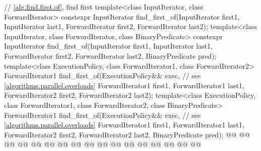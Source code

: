 \begin{codeblock}
{  // \ref{alg.find.first.of}, find first
  template<class InputIterator, class ForwardIterator>
    constexpr InputIterator
      find_first_of(InputIterator first1, InputIterator last1,
                    ForwardIterator first2, ForwardIterator last2);
  template<class InputIterator, class ForwardIterator, class BinaryPredicate>
    constexpr InputIterator
      find_first_of(InputIterator first1, InputIterator last1,
                    ForwardIterator first2, ForwardIterator last2,
                    BinaryPredicate pred);
  template<class ExecutionPolicy, class ForwardIterator1, class ForwardIterator2>
    ForwardIterator1
      find_first_of(ExecutionPolicy&& exec, // see \ref{algorithms.parallel.overloads}
                    ForwardIterator1 first1, ForwardIterator1 last1,
                    ForwardIterator2 first2, ForwardIterator2 last2);
  template<class ExecutionPolicy, class ForwardIterator1,
           class ForwardIterator2, class BinaryPredicate>
    ForwardIterator1
      find_first_of(ExecutionPolicy&& exec, // see \ref{algorithms.parallel.overloads}
                    ForwardIterator1 first1, ForwardIterator1 last1,
                    ForwardIterator2 first2, ForwardIterator2 last2,
                    BinaryPredicate pred);
  @@
    @@
        @@
        @@
      @@
        @@
                      @@
                      @@
    @@
        @@
        @@
          @@
      @@
        @@
                      @@
                      @@
  @\added{\}}@

}
\end{codeblock}
